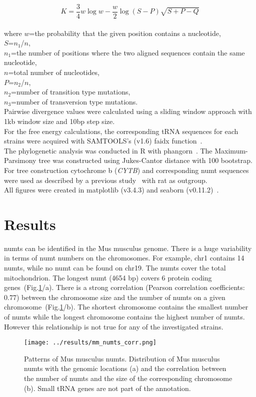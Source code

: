 \documentclass[a4paper,12pt]{article}
\numberwithin{equation}{section} %
\begin{document}
\begin{equation}\label{eq:kimura2}
	K=\frac{3}{4}w\log w- \frac{w}{2} \log (S-P) \sqrt{S+P-Q}
\end{equation}\\
where $w$=the probability that the given position contains a nucleotide,\\
$S$=$n_1$/$n$,\\
$n_1$=the number of positions where the two aligned sequences contain the same nucleotide,\\
$n$=total number of nucleotides,\\
$P$=$n_2$/$n$,\\
$n_2$=number of transition type mutations,\\
$n_3$=number of transversion type mutations.\\

Pairwise divergence values were calculated using a sliding window approach with 1kb window size and 10bp step size.\\ \indent For the free energy calculations, the corresponding tRNA sequences for each strains were acquired with SAMTOOLS's (v1.6) faidx function~.\\ \indent The phylogenetic analysis was conducted in R with phangorn~. The Maximum-Parsimony tree was constructed using Jukes-Cantor distance with 100 bootstrap. For tree construction cytochrome b (\textit{CYTB}) and corresponding numt sequences were used as described by a previous study~ with rat as outgroup.\\ \indent All figures were created in matplotlib (v3.4.3) and seaborn (v0.11.2)~.

\section{Results}
 numts can be identified in the Mus musculus genome. There is a huge variability in terms of numt numbers on the chromosomes. For example, chr1 contains 14 numts, while no numt can be found on chr19. The numts cover the total mitochondrion. The longest numt (4654 bp) covers 6 protein coding genes~(Fig.\ref{fig:mm_numts_corr}/a). There is a strong correlation (Pearson correlation coefficients: 0.77) between the chromosome size and the number of numts on a given chromosome~(Fig.\ref{fig:mm_numts_corr}/b). The shortest chromosome contains the smallest number of numts while the longest chromosome contains the highest number of numts. However this relationship is not true for any of the investigated strains.
\begin{figure}[H]
    \centering
    \captionsetup{justification=centering}
    \texttt{[image: ../results/mm\_numts\_corr.png]}
    \caption{Patterns of Mus musculus numts. Distribution of Mus musculus numts with the genomic locations (a) and the correlation between the number of numts and the size of the corresponding chromosome (b). Small tRNA genes are not part of the annotation.}
    \label{fig:mm_numts_corr}
\end{figure}
\end{document}
